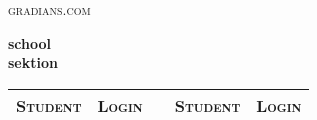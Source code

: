 \documentclass{tufte-handout}
\begin{document}
  \begin{fullwidth}
    \begin{flushleft}
      \huge \textsc{gradians.com}
    \end{flushleft}
    \begin{flushright}\LARGE
      \textbf{school}\quad\qquad\qquad\qquad\qquad\qquad \\
      \textbf{sektion}\quad\qquad\qquad\qquad\qquad\qquad \\
    \end{flushright}
    \begin{table}
      \begin{tabular}{llcll}
        \toprule
          \textsc{Student} & \textsc{Login} & \hspace{2cm} & \textsc{Student} & \textsc{Login} \\
        \midrule
      \end{tabular}
    \end{table}
  \end{fullwidth}
\end{document}
